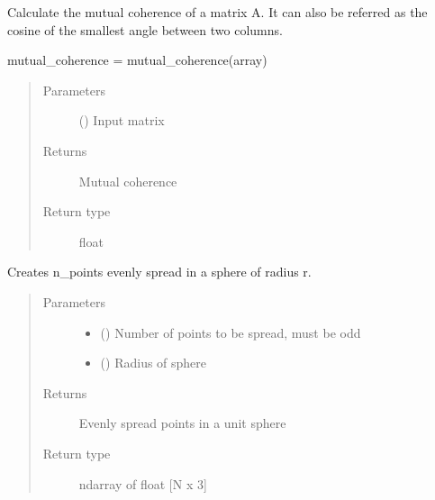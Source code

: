 \documentclass[letterpaper,10pt,english,openany,oneside]{sphinxmanual}
\begin{document}

\begin{fulllineitems}
\label{\detokenize{pygpc:pygpc.misc.mutual_coherence}}
Calculate the mutual coherence of a matrix A. It can also be referred as the cosine of the smallest angle
between two columns.

mutual\_coherence = mutual\_coherence(array)
\begin{quote}\begin{description}
\item[{Parameters}] \leavevmode
{} () \textendash{} Input matrix

\item[{Returns}] \leavevmode
{} \textendash{} Mutual coherence

\item[{Return type}] \leavevmode
float

\end{description}\end{quote}

\end{fulllineitems}


\begin{fulllineitems}
\label{\detokenize{pygpc:pygpc.misc.sample_sphere}}
Creates n\_points evenly spread in a sphere of radius r.
\begin{quote}\begin{description}
\item[{Parameters}] \leavevmode\begin{itemize}
\item {} 
 () \textendash{} Number of points to be spread, must be odd

\item {} 
 () \textendash{} Radius of sphere

\end{itemize}

\item[{Returns}] \leavevmode
{} \textendash{} Evenly spread points in a unit sphere

\item[{Return type}] \leavevmode
ndarray of float {[}N x 3{]}

\end{description}\end{quote}

\end{fulllineitems}
\end{document}
